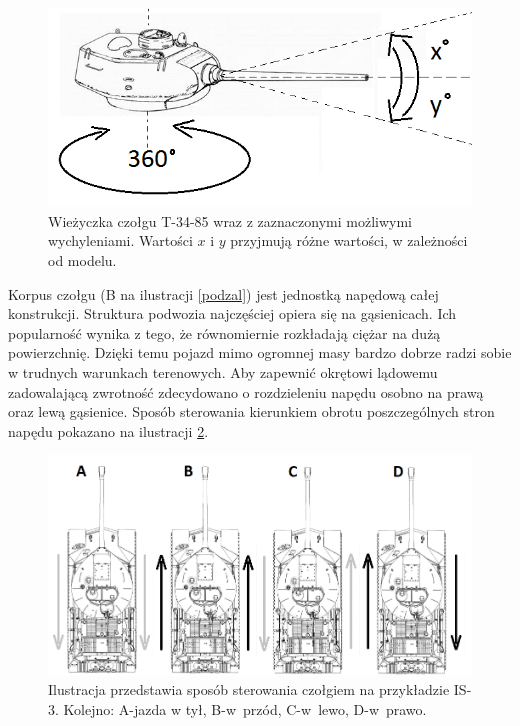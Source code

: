   \begin{figure}[H]
    \begin{center}
      \includegraphics[scale=0.55]{imgs/wiezyczka.png}
 	\caption[Wieżyczka \textit{T-34-85}]{\small{Wieżyczka czołgu T-34-85 wraz z zaznaczonymi możliwymi wychyleniami. Wartości $x$ i $y$ przyjmują różne wartości, w zależności od modelu.}\footnotemark}
	\label{wez_czolg}
    \end{center}
  \end{figure}

Korpus czołgu (B na ilustracji \ref{podzal}) jest jednostką napędową całej konstrukcji. Struktura podwozia najczęściej opiera się na gąsienicach. Ich popularność wynika z tego, że równomiernie rozkładają ciężar na dużą powierzchnię. Dzięki temu pojazd mimo ogromnej masy bardzo dobrze radzi sobie w trudnych warunkach terenowych. Aby zapewnić okrętowi lądowemu zadowalającą zwrotność zdecydowano o rozdzieleniu napędu osobno na prawą oraz lewą gąsienice. Sposób sterowania kierunkiem obrotu poszczególnych stron napędu pokazano na ilustracji \ref{ster}. 

  \begin{figure}[H]
    \begin{center}
      \includegraphics[scale=0.45]{imgs/ster.png}
 	\caption[Czołg \textit{IS-3} - sterowanie]{\small{Ilustracja przedstawia sposób sterowania czołgiem na przykładzie IS-3. Kolejno: A-jazda w tył, B-w~przód, C-w~lewo, D-w~prawo.}\footnotemark}
	\label{ster}
    \end{center}
  \end{figure}


